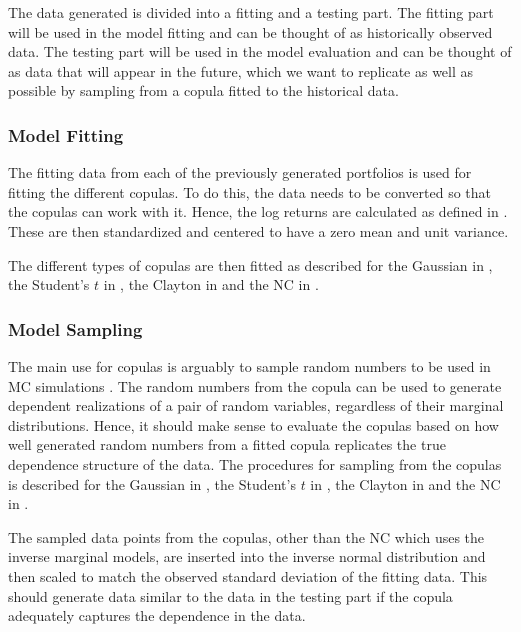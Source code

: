 The data generated is divided into a fitting and a testing part. The fitting part will be used in the model fitting and can be thought of as historically observed data. The testing part will be used in the model evaluation and can be thought of as data that will appear in the future, which we want to replicate as well as possible by sampling from a copula fitted to the historical data. 

\subsubsection{Model Fitting}
The fitting data from each of the previously generated portfolios is used for fitting the different copulas. To do this, the data needs to be converted so that the copulas can work with it. Hence, the log returns are calculated as defined in . These are then standardized and centered to have a zero mean and unit variance. 

The different types of copulas are then fitted as described for the Gaussian in , the Student's $t$ in , the Clayton in  and the \gls{NC} in . 


\subsubsection{Model Sampling}
The main use for copulas is arguably to sample random numbers to be used in \gls{MC} simulations . The random numbers from the copula can be used to generate dependent realizations of a pair of random variables, regardless of their marginal distributions. Hence, it should make sense to evaluate the copulas based on how well generated random numbers from a fitted copula replicates the true dependence structure of the data. The procedures for sampling from the copulas is described for the Gaussian in , the Student's $t$ in , the Clayton in  and the \gls{NC} in . 

The sampled data points from the copulas, other than the \gls{NC} which uses the inverse marginal models, are inserted into the inverse normal distribution and then scaled to match the observed standard deviation of the fitting data. This should generate data similar to the data in the testing part if the copula adequately captures the dependence in the data.

